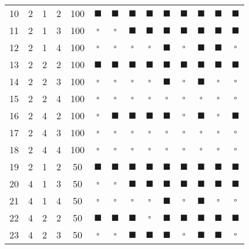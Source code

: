 \begin{table}[!htb]
{\begin{tabular}{c | c c c c | c | c | c | c | c | c | c | c | c}
			10 & 2 & 1 & 2 & 100 & $\blacksquare$ & $\blacksquare$ & $\blacksquare$ & $\blacksquare$ & $\blacksquare$ & $\blacksquare$ & $\blacksquare$ & $\blacksquare$ & $\blacksquare$ \\
			11 & 2 & 1 & 3 & 100 & $\square$ & $\square$ & $\blacksquare$ & $\blacksquare$ & $\blacksquare$ & $\blacksquare$ & $\blacksquare$ & $\blacksquare$ & $\blacksquare$ \\
			12 & 2 & 1 & 4 & 100 & $\square$ & $\square$ & $\square$ & $\square$ & $\blacksquare$ & $\square$ & $\blacksquare$ & $\blacksquare$ & $\square$  \\
			13 & 2 & 2 & 2 & 100 & $\blacksquare$ & $\blacksquare$ & $\blacksquare$ & $\blacksquare$ & $\blacksquare$ & $\blacksquare$ & $\blacksquare$ & $\blacksquare$ & $\blacksquare$ \\
			14 & 2 & 2 & 3 & 100 & $\square$ & $\square$ & $\square$ & $\square$ & $\blacksquare$ & $\square$ & $\blacksquare$ & $\square$ & $\square$  \\
			15 & 2 & 2 & 4 & 100 & $\square$ & $\square$ & $\square$ & $\square$ & $\square$ & $\square$ & $\square$ & $\square$ & $\square$ \\
			16 & 2 & 4 & 2 & 100 & $\square$ & $\blacksquare$ & $\blacksquare$ & $\blacksquare$ & $\blacksquare$ & $\square$ & $\blacksquare$ & $\square$ & $\blacksquare$ \\
			17 & 2 & 4 & 3 & 100 & $\square$ & $\square$ & $\square$ & $\square$ & $\square$ & $\square$ & $\square$ & $\square$ & $\square$ \\
			18 & 2 & 4 & 4 & 100 & $\square$ & $\square$ & $\square$ & $\square$ & $\square$ & $\square$ & $\square$ & $\square$ & $\square$ \\
			19 & 2 & 1 & 2 & 50 & $\blacksquare$ & $\blacksquare$ & $\blacksquare$ & $\blacksquare$ & $\blacksquare$ & $\blacksquare$ & $\blacksquare$ & $\blacksquare$ & $\blacksquare$\\
			20 & 4 & 1 & 3 & 50 & $\square$ & $\square$ & $\blacksquare$ & $\blacksquare$ & $\blacksquare$ & $\blacksquare$ & $\blacksquare$ & $\blacksquare$ & $\blacksquare$ \\
			21 & 4 & 1 & 4 & 50 & $\square$ & $\square$ & $\square$ & $\square$ & $\blacksquare$ & $\square$ & $\blacksquare$ & $\square$ & $\square$ \\
			22 & 4 & 2 & 2 & 50 & $\blacksquare$ & $\blacksquare$ & $\blacksquare$ & $\square$ & $\blacksquare$ & $\blacksquare$ & $\blacksquare$ & $\blacksquare$ & $\blacksquare$ \\
			23 & 4 & 2 & 3 & 50 & $\square$ & $\square$ & $\blacksquare$ & $\blacksquare$ & $\blacksquare$ & $\square$ & $\blacksquare$ & $\blacksquare$ & $\square$ \\

\end{tabular}}
\end{table}
